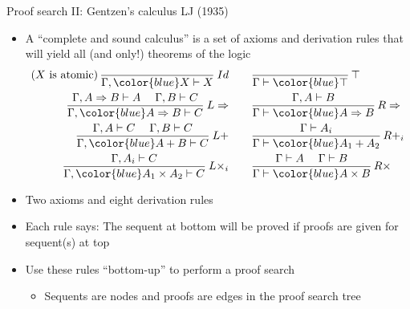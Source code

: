 \documentclass[english]{beamer}
\begin{document}
\begin{frame}{Proof search II: Gentzen's calculus LJ (1935)}

\begin{itemize}
\item A ``complete and sound calculus'' is a set of axioms and derivation
rules that will yield all (and only!) theorems of the logic
\begin{align*}
\text{(}X\text{ is atomic)\,}\frac{}{\Gamma,{\color{blue}X}\vdash X}\:Id & \qquad\frac{}{\Gamma\vdash{\color{blue}\top}}\,\top\\
\frac{\Gamma,A\Rightarrow B\vdash A\quad\;\Gamma,B\vdash C}{\Gamma,{\color{blue}A\Rightarrow B}\vdash C}\:L\Rightarrow & \qquad\frac{\Gamma,A\vdash B}{\Gamma\vdash{\color{blue}A\Rightarrow B}}\,R\Rightarrow\\
\frac{\Gamma,A\vdash C\quad\;\Gamma,B\vdash C}{\Gamma,{\color{blue}A+B}\vdash C}\:L+ & \qquad\frac{\Gamma\vdash A_{i}}{\Gamma\vdash{\color{blue}A_{1}+A_{2}}}\,R+_{i}\\
\frac{\Gamma,A_{i}\vdash C}{\Gamma,{\color{blue}A_{1}\times A_{2}}\vdash C}\:L\times_{i} & \qquad\frac{\Gamma\vdash A\quad\;\Gamma\vdash B}{\Gamma\vdash{\color{blue}A\times B}}\,R\times
\end{align*}
\item Two axioms and eight derivation rules
\item Each rule says: The sequent at bottom will be proved if proofs are
given for sequent(s) at top
\item Use these rules ``bottom-up'' to perform a proof search
\begin{itemize}
\item Sequents are nodes and proofs are edges in the proof search tree
\end{itemize}
\end{itemize}
\end{frame}
\end{document}
